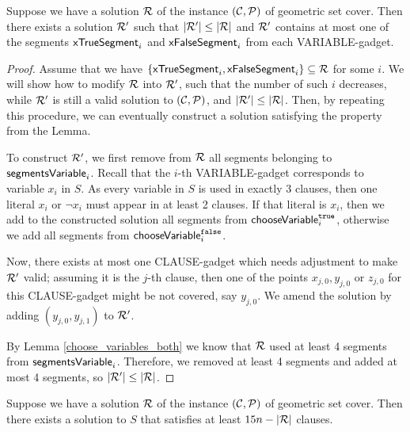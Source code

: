\begin{lemma}
	\label{at_most_one_var_segment}
	Suppose we have a solution $\mathcal{R}$ of the instance $(\mathcal{C}, \mathcal{P})$
	of geometric set cover.
	Then there exists a solution $\mathcal{R}'$ such that $|\mathcal{R}'| \le |\mathcal{R}|$
	and $\mathcal{R}'$ contains
	at most one of the segments $\mathsf{xTrueSegment}_{i}$ and $\mathsf{xFalseSegment}_{i}$
	from each VARIABLE-gadget.
\end{lemma}
\begin{proof}\leavevmode
Assume that we have $\{\mathsf{xTrueSegment}_{i}, \mathsf{xFalseSegment}_{i}\} \subseteq \mathcal{R}$ for some $i$.
We will show how to modify $\mathcal{R}$ into $\mathcal{R}'$,
such that the number of such $i$ decreases,
while $\mathcal{R}'$ is still a valid solution to $(\mathcal{C}, \mathcal{P})$,
and $|\mathcal{R}'| \le |\mathcal{R}|$. Then, by repeating this procedure,
we can eventually construct a solution satisfying the property from the Lemma.

To construct $\mathcal{R}'$, 
we first remove from $\mathcal{R}$ all segments belonging to $\mathsf{segmentsVariable}_{i}$.
Recall that the $i$-th VARIABLE-gadget corresponds to variable $x_i$ in $S$.
As every variable in $S$ is used in exactly 3 clauses,
then one literal $x_i$ or $\neg x_i$ must appear in at least
2 clauses.
If that literal is $x_i$, then we add to the constructed solution all segments from $\mathsf{chooseVariable}^{\texttt{true}}_{i}$,
otherwise we add all segments from $\mathsf{chooseVariable}^{\texttt{false}}_{i}$.

Now, there exists at most one CLAUSE-gadget which needs adjustment to make $\mathcal{R}'$ valid;
assuming it is the $j$-th clause, then one of the points $x_{j,0}, y_{j,0}$ or $z_{j,0}$ for this
CLAUSE-gadget might be not covered, say $y_{j,0}$.
We amend the solution by adding $(y_{j,0}, y_{j,1})$ to $\mathcal{R}'$.

By Lemma \ref{choose_variables_both} we know 
that $\mathcal{R}$ used at least 4 segments from $\mathsf{segmentsVariable}_{i}$.
Therefore, we removed at least 4 segments and added at most 4 segments,
so $|\mathcal{R}'| \le |\mathcal{R}|$.
\end{proof}

\begin{lemma}
	\label{construction_completness}
	Suppose we have a solution $\mathcal{R}$ of the instance $(\mathcal{C}, \mathcal{P})$
	of geometric set cover.
	Then there exists a solution to $S$
	that satisfies at least $15n - |\mathcal{R}|$ clauses.
\end{lemma}


